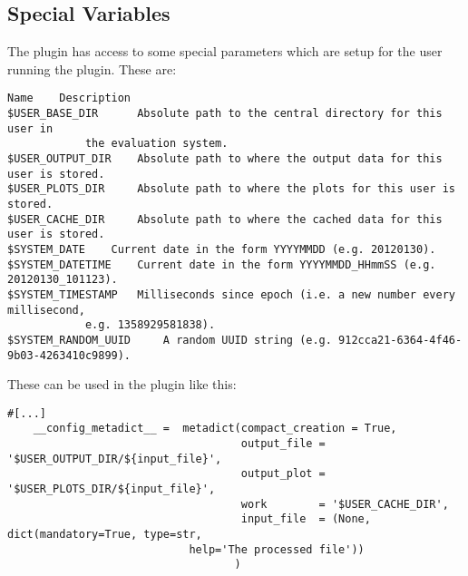 \documentclass[a4paper,11pt]{ltxdoc}
\begin{document}
\subsection{Special Variables}
 The plugin has access to some special parameters which are setup for the user running the plugin. These are:
\begin{verbatim}
Name 	Description
$USER_BASE_DIR 		Absolute path to the central directory for this user in 
			the evaluation system.
$USER_OUTPUT_DIR 	Absolute path to where the output data for this user is stored.
$USER_PLOTS_DIR 	Absolute path to where the plots for this user is stored.
$USER_CACHE_DIR 	Absolute path to where the cached data for this user is stored.
$SYSTEM_DATE 	Current date in the form YYYYMMDD (e.g. 20120130).
$SYSTEM_DATETIME 	Current date in the form YYYYMMDD_HHmmSS (e.g. 20120130_101123).
$SYSTEM_TIMESTAMP 	Milliseconds since epoch (i.e. a new number every millisecond, 
			e.g. 1358929581838).
$SYSTEM_RANDOM_UUID 	A random UUID string (e.g. 912cca21-6364-4f46-9b03-4263410c9899).
\end{verbatim}
These can be used in the plugin like this:
\begin{verbatim}
#[...]
    __config_metadict__ =  metadict(compact_creation = True,
                                    output_file = '$USER_OUTPUT_DIR/${input_file}',
                                    output_plot = '$USER_PLOTS_DIR/${input_file}',
                                    work        = '$USER_CACHE_DIR',
                                    input_file  = (None, dict(mandatory=True, type=str, 
						    help='The processed file'))
                                   )
\end{verbatim}
\end{document}
